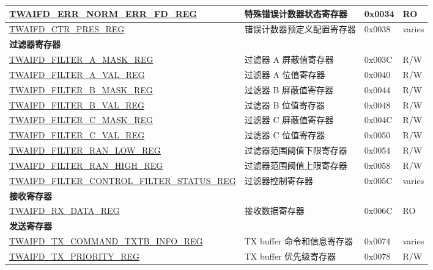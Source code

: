 \begin{longtable}{ | p{6cm} | p{7.2cm} | p{1.3cm} | p{1.5cm} | }
\hyperref[regdesc:TWAIFDERRNORMERRFDREG]{TWAIFD\_ERR\_NORM\_ERR\_FD\_REG} & 特殊错误计数器状态寄存器 & 0x0034 & RO \\ \hline
\hyperref[regdesc:TWAIFDCTRPRESREG]{TWAIFD\_CTR\_PRES\_REG} & 错误计数器预定义配置寄存器 & 0x0038 & varies \\ \hline
\multicolumn{4}{|l|}{\textbf{过滤器寄存器}} \\ \hline
\hyperref[regdesc:TWAIFDFILTERAMASKREG]{TWAIFD\_FILTER\_A\_MASK\_REG} & 过滤器 A 屏蔽值寄存器 & 0x003C & R/W \\ \hline
\hyperref[regdesc:TWAIFDFILTERAVALREG]{TWAIFD\_FILTER\_A\_VAL\_REG} & 过滤器 A 位值寄存器 & 0x0040 & R/W \\ \hline
\hyperref[regdesc:TWAIFDFILTERBMASKREG]{TWAIFD\_FILTER\_B\_MASK\_REG} & 过滤器 B 屏蔽值寄存器 & 0x0044 & R/W \\ \hline
\hyperref[regdesc:TWAIFDFILTERBVALREG]{TWAIFD\_FILTER\_B\_VAL\_REG} & 过滤器 B 位值寄存器 & 0x0048 & R/W \\ \hline
\hyperref[regdesc:TWAIFDFILTERCMASKREG]{TWAIFD\_FILTER\_C\_MASK\_REG} & 过滤器 C 屏蔽值寄存器 & 0x004C & R/W \\ \hline
\hyperref[regdesc:TWAIFDFILTERCVALREG]{TWAIFD\_FILTER\_C\_VAL\_REG} & 过滤器 C 位值寄存器 & 0x0050 & R/W \\ \hline
\hyperref[regdesc:TWAIFDFILTERRANLOWREG]{TWAIFD\_FILTER\_RAN\_LOW\_REG} & 过滤器范围阈值下限寄存器 & 0x0054 & R/W \\ \hline
\hyperref[regdesc:TWAIFDFILTERRANHIGHREG]{TWAIFD\_FILTER\_RAN\_HIGH\_REG} & 过滤器范围阈值上限寄存器 & 0x0058 & R/W \\ \hline
\hyperref[regdesc:TWAIFDFILTERCONTROLFILTERSTATUSREG]{TWAIFD\_FILTER\_CONTROL\_FILTER\newline \_STATUS\_REG} & 过滤器控制寄存器 & 0x005C & varies \\ \hline
\multicolumn{4}{|l|}{\textbf{接收寄存器}} \\ \hline
\hyperref[regdesc:TWAIFDRXDATAREG]{TWAIFD\_RX\_DATA\_REG} & 接收数据寄存器 & 0x006C & RO \\ \hline
\multicolumn{4}{|l|}{\textbf{发送寄存器}} \\ \hline
\hyperref[regdesc:TWAIFDTXCOMMANDTXTBINFOREG]{TWAIFD\_TX\_COMMAND\_TXTB\_INFO\newline \_REG} & TX buffer 命令和信息寄存器 & 0x0074 & varies \\ \hline
\hyperref[regdesc:TWAIFDTXPRIORITYREG]{TWAIFD\_TX\_PRIORITY\_REG} & TX buffer 优先级寄存器 & 0x0078 & R/W \\ \hline

\end{longtable}
